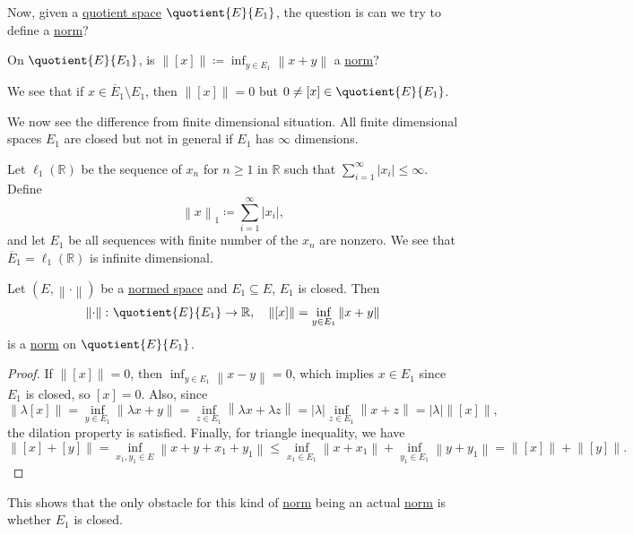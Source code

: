 Now, given a \hyperref[def:quotient-space]{quotient space} \(\quotient{E}{E_1} \), the question is can we try to define a \hyperref[def:norm]{norm}?

\begin{problem}
On \(\quotient{E}{E_1} \), is \(\left\lVert [x]\right\rVert \coloneqq \inf _{y\in E_1} \left\lVert x+y\right\rVert \) a \hyperref[def:norm]{norm}?
\end{problem}
\begin{answer}
	We see that if \(x\in \overline{E}_1 \setminus E_1 \), then \(\left\lVert [x]\right\rVert = 0\) but \(0 \neq [x]\in \quotient{E}{E_1} \).
\end{answer}

We now see the difference from finite dimensional situation. All finite dimensional spaces \(E_1\) are closed but not in general if \(E_1\) has \(\infty \) dimensions.

\begin{eg}
	Let \(\ell _1(\mathbb{R} )\) be the sequence of \(x_n\) for \(n \geq 1\) in \(\mathbb{R} \) such that \(\sum_{i=1}^{\infty} \left\vert x_i \right\vert \leq \infty\). Define
	\[
		\left\lVert x\right\rVert _1 \coloneqq \sum_{i=1}^{\infty} \left\vert x_i \right\vert ,
	\]
	and let \(E_1\) be all sequences with finite number of the \(x_n\) are nonzero. We see that \(\overline{E}_1= \ell _1(\mathbb{R} ) \) is infinite dimensional.
\end{eg}

\begin{proposition}
	Let \((E, \left\lVert \cdot\right\rVert)\) be a \hyperref[def:normed-vector-space]{normed space} and \(E_1\subseteq E\), \(E_1\) is closed. Then
	\[
		\left\lVert \cdot\right\rVert \colon \quotient{E}{E_1} \to \mathbb{R},\quad \left\lVert [x]\right\rVert = \inf _{y\in E_1} \left\lVert x+y\right\rVert
	\]
	is a \hyperref[def:norm]{norm} on \(\quotient{E}{E_1} \).
\end{proposition}
\begin{proof}
	If \(\left\lVert [x]\right\rVert = 0\), then \(\inf _{y\in E_1}\left\lVert x-y\right\rVert = 0\), which implies \(x\in E_1\) since \(E_1\) is closed, so \([x] = 0\). Also, since
	\[
		\left\lVert \lambda [x]\right\rVert = \inf _{y\in E_1}\left\lVert \lambda x + y\right\rVert = \inf _{z\in E_1}\left\lVert \lambda x + \lambda z\right\rVert = \left\vert \lambda  \right\vert \inf _{z\in E_1} \left\lVert x+z\right\rVert = \left\vert \lambda  \right\vert \left\lVert [x]\right\rVert,
	\]
	the dilation property is satisfied. Finally, for triangle inequality, we have
	\[
		\left\lVert [x] + [y]\right\rVert = \inf _{x_1, y_1 \in E} \left\lVert x+y + x_1 + y_1\right\rVert \leq \inf _{x_1\in E_1}\left\lVert x + x_1\right\rVert + \inf _{y_1\in E_1}\left\lVert y + y_1\right\rVert = \left\lVert [x]\right\rVert + \left\lVert [y]\right\rVert.
	\]
\end{proof}
\begin{remark}
	This shows that the only obstacle for this kind of \hyperref[def:norm]{norm} being an actual \hyperref[def:norm]{norm} is whether \(E_1\) is closed.
\end{remark}

